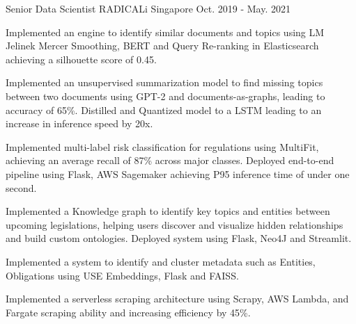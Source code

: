 \begin{cventries}
  \cventry
    {Senior Data Scientist} %
    {RADICALi} %
    {Singapore} %
    {Oct. 2019 - May. 2021} %
    {
      \begin{cvitems} %
        \item {Implemented an engine to identify similar documents and topics using LM Jelinek Mercer Smoothing, BERT and Query Re-ranking in Elasticsearch achieving a silhouette score of 0.45.}
        \item {Implemented an unsupervised summarization model to find missing topics between two documents using GPT-2 and documents-as-graphs, leading to accuracy of 65\%. Distilled and Quantized model to a LSTM leading to an increase in inference speed by 20x. }
        \item {Implemented multi-label risk classification for regulations using MultiFit, achieving an average recall of 87\% across major classes. Deployed end-to-end pipeline using Flask, AWS Sagemaker achieving P95 inference time of under one second.}
        \item{Implemented a Knowledge graph to identify key topics and entities between upcoming legislations, helping users discover and visualize hidden relationships and build custom ontologies. Deployed system using Flask, Neo4J and Streamlit.}
        \item{Implemented a system to identify and cluster metadata such as Entities, Obligations using USE Embeddings, Flask and FAISS.}
        \item{Implemented a serverless scraping architecture using Scrapy, AWS Lambda, and Fargate scraping ability and increasing efficiency by 45\%.}
      \end{cvitems}
    }


\end{cventries}
